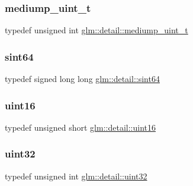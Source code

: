 \mbox{\label{namespaceglm_1_1detail_a98f572e92099cc1b5740f1ccf1c80f8d}} 
\subsubsection{\texorpdfstring{mediump\+\_\+uint\+\_\+t}{mediump\_uint\_t}}
{\footnotesize\ttfamily typedef unsigned int \hyperlink{namespaceglm_1_1detail_a98f572e92099cc1b5740f1ccf1c80f8d}{glm\+::detail\+::mediump\+\_\+uint\+\_\+t}}

\mbox{\label{namespaceglm_1_1detail_aa9fd5478f3e347aa0b2d1a8bf3408544}} 
\subsubsection{\texorpdfstring{sint64}{sint64}}
{\footnotesize\ttfamily typedef signed long long \hyperlink{namespaceglm_1_1detail_aa9fd5478f3e347aa0b2d1a8bf3408544}{glm\+::detail\+::sint64}}

\mbox{\label{namespaceglm_1_1detail_a47b2a7d006d187338e8031a352d1ce56}} 
\subsubsection{\texorpdfstring{uint16}{uint16}}
{\footnotesize\ttfamily typedef unsigned short \hyperlink{namespaceglm_1_1detail_a47b2a7d006d187338e8031a352d1ce56}{glm\+::detail\+::uint16}}

\mbox{\label{namespaceglm_1_1detail_ade6cfbf377022aaa391af8cd50489222}} 
\subsubsection{\texorpdfstring{uint32}{uint32}}
{\footnotesize\ttfamily typedef unsigned int \hyperlink{namespaceglm_1_1detail_ade6cfbf377022aaa391af8cd50489222}{glm\+::detail\+::uint32}}

